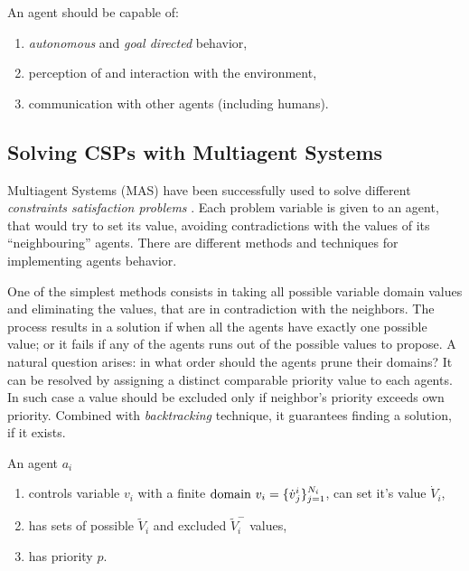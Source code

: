 \documentclass[ThesisDoc]{subfiles}
\begin{document}
\bigskip

\noindent
An agent should be capable of:
\begin{enumerate}
  \item \emph{autonomous} and \emph{goal directed} behavior,
  \item perception of and interaction with the environment,
  \item communication with other agents (including humans).
\end{enumerate}

\todo{}

\subsection{Solving CSPs with Multiagent Systems}
\medskip

Multiagent Systems (MAS) have been successfully used to solve
different \emph{constraints satisfaction problems} \cite{MAS, MAS-Survey}.
Each problem variable is given to an agent, that would try to set its value,
avoiding contradictions with the values of its ``neighbouring'' agents.
There are different methods and techniques for implementing agents behavior.

One of the simplest methods consists in taking all possible variable domain values
and eliminating the values, that are in contradiction with the neighbors.
The process results in a solution if when all the agents have exactly one
possible value; or it fails if any of the agents runs out of the possible
values to propose. A natural question arises: in what order should the agents
prune their domains?
It can be resolved by assigning a distinct comparable priority value to each agents.
In such case a value should be excluded only if neighbor's priority exceeds own priority.
Combined with \emph{backtracking} technique, it guarantees finding a solution,
if it exists.

\noindent
An agent $a_i$
\begin{enumerate}
  \item controls variable $v_i$ with a finite $\mathrm{domain}~v_i =
        \{{\dot v}^i_j\}_{j=1}^{N_i}$, can set it's value ${\dot V}_i$,
  \item has sets of possible ${\tilde V}_i$ and excluded ${\tilde V}_i^-$ values,
  \item has priority $p$.
\end{enumerate}
\end{document}
